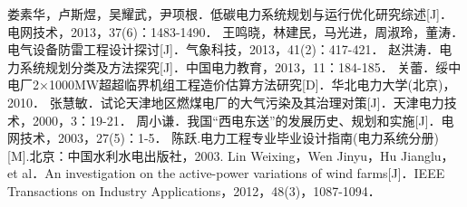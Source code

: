 \begin{spacing}{1.5}
\begin{thebibliography}{99}

 娄素华，卢斯煜，吴耀武，尹项根．低碳电力系统规划与运行优化研究综述[J]．电网技术，2013，37(6)：1483-1490．
 王鸣晓，林建民，马光进，周淑玲，董涛．电气设备防雷工程设计探讨[J]．气象科技，2013，41(2)：417-421．
 赵洪涛．电力系统规划分类及方法探究[J]．中国电力教育，2013，11：184-185．
 关蕾．绥中电厂2×1000MW超超临界机组工程造价估算方法研究[D]．华北电力大学(北京)，2010．
 张慧敏．试论天津地区燃煤电厂的大气污染及其治理对策[J]．天津电力技术，2000，3：19-21． 
 周小谦．我国“西电东送”的发展历史、规划和实施[J]．电网技术，2003，27(5)：1-5．
 陈跃.电力工程专业毕业设计指南(电力系统分册) [M].北京：中国水利水电出版社，2003.
 Lin Weixing，Wen Jinyu，Hu Jianglu，et al．An investigation on the active-power variations of wind farms[J]．IEEE Transactions on Industry Applications，2012，48(3)，1087-1094．

\end{thebibliography}

\end{spacing}